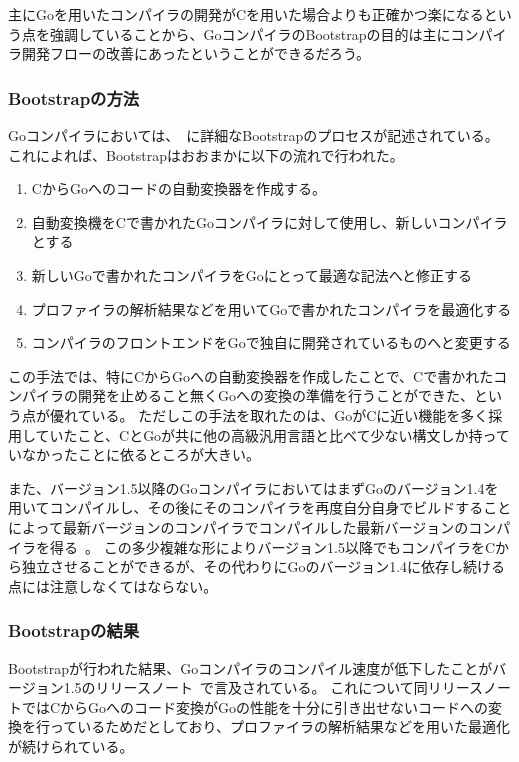 主にGoを用いたコンパイラの開発がCを用いた場合よりも正確かつ楽になるという点を強調していることから、GoコンパイラのBootstrapの目的は主にコンパイラ開発フローの改善にあったということができるだろう。

\subsubsection{Bootstrapの方法}

Goコンパイラにおいては、~\cite{go-compiler-overhaul}に詳細なBootstrapのプロセスが記述されている。
これによれば、Bootstrapはおおまかに以下の流れで行われた。

\begin{enumerate}
\item CからGoへのコードの自動変換器を作成する。
\item 自動変換機をCで書かれたGoコンパイラに対して使用し、新しいコンパイラとする
\item 新しいGoで書かれたコンパイラをGoにとって最適な記法へと修正する
\item プロファイラの解析結果などを用いてGoで書かれたコンパイラを最適化する
\item コンパイラのフロントエンドをGoで独自に開発されているものへと変更する
\end{enumerate}

この手法では、特にCからGoへの自動変換器を作成したことで、Cで書かれたコンパイラの開発を止めること無くGoへの変換の準備を行うことができた、という点が優れている。
ただしこの手法を取れたのは、GoがCに近い機能を多く採用していたこと、CとGoが共に他の高級汎用言語と比べて少ない構文しか持っていなかったことに依るところが大きい。

また、バージョン1.5以降のGoコンパイラにおいてはまずGoのバージョン1.4を用いてコンパイルし、その後にそのコンパイラを再度自分自身でビルドすることによって最新バージョンのコンパイラでコンパイルした最新バージョンのコンパイラを得る~\cite{go-bootstrap-plan}。
この多少複雑な形によりバージョン1.5以降でもコンパイラをCから独立させることができるが、その代わりにGoのバージョン1.4に依存し続ける点には注意しなくてはならない。

\subsubsection{Bootstrapの結果}

Bootstrapが行われた結果、Goコンパイラのコンパイル速度が低下したことがバージョン1.5のリリースノート~\cite{go-15-release}で言及されている。
これについて同リリースノートではCからGoへのコード変換がGoの性能を十分に引き出せないコードへの変換を行っているためだとしており、プロファイラの解析結果などを用いた最適化が続けられている。


